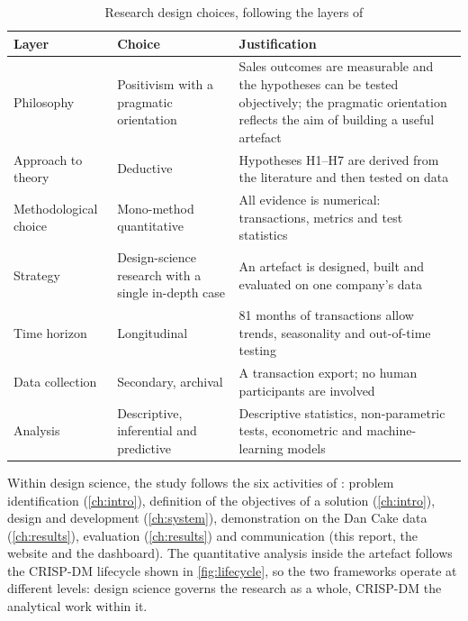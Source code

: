 \begin{table}[htbp]\centering\small
\caption{Research design choices, following the layers of \citet{saunders2019}}\label{tab:onion}
\begin{tabularx}{\linewidth}{@{}p{3.1cm}p{3.4cm}X@{}}
\toprule
\textbf{Layer} & \textbf{Choice} & \textbf{Justification} \\ \midrule
Philosophy & Positivism with a pragmatic orientation & Sales outcomes are measurable and the hypotheses can be tested objectively; the pragmatic orientation reflects the aim of building a useful artefact \\
Approach to theory & Deductive & Hypotheses H1--H7 are derived from the literature and then tested on data \\
Methodological choice & Mono-method quantitative & All evidence is numerical: transactions, metrics and test statistics \citep{creswell2018} \\
Strategy & Design-science research with a single in-depth case & An artefact is designed, built and evaluated on one company's data \citep{hevner2004, peffers2007} \\
Time horizon & Longitudinal & 81 months of transactions allow trends, seasonality and out-of-time testing \\
Data collection & Secondary, archival & A transaction export; no human participants are involved \\
Analysis & Descriptive, inferential and predictive & Descriptive statistics, non-parametric tests, econometric and machine-learning models \\ \bottomrule
\end{tabularx}
\end{table}

Within design science, the study follows the six activities of \citet{peffers2007}: problem identification
(\cref{ch:intro}), definition of the objectives of a solution (\cref{ch:intro}), design and development
(\cref{ch:system}), demonstration on the Dan Cake data (\cref{ch:results}), evaluation (\cref{ch:results}) and
communication (this report, the website and the dashboard). The quantitative analysis inside the artefact
follows the CRISP-DM lifecycle shown in \cref{fig:lifecycle}, so the two frameworks operate at different levels:
design science governs the research as a whole, CRISP-DM the analytical work within it.

